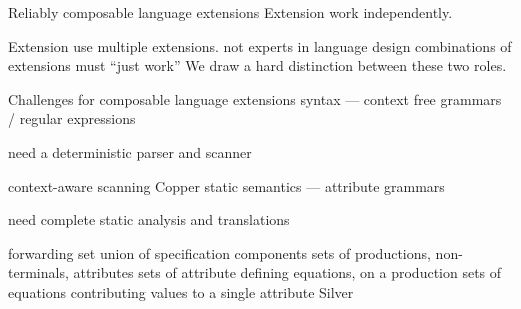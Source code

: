 \documentclass[11pt,aspectratio=169]{beamer}
\begin{document}
\begin{frame}{Reliably composable language extensions}
\biA
\x Extension  work independently.

\x Extension  use multiple extensions.
 \bi
  \x not experts in language design
  \x combinations of extensions must ``just work''
 \ei
\x We draw a hard distinction between these two roles.
\ei
{}
\end{frame}

\begin{frame}[t]{Challenges for composable language extensions}
\be
 \x syntax ---     context free grammars / regular expressions

    need a deterministic parser and scanner

  \bi
    context-aware scanning %
    Copper
  \ei
 \x static semantics ---     attribute grammars
    
    need complete static analysis and translations

  \bi
    forwarding %
    set union of specification components
    \bi
     \x sets of productions, non-terminals, attributes
     \x sets of attribute defining equations, on a production
     \x sets of equations contributing values to a single attribute
    \ei
    Silver
  \ei
\ee

\end{frame}
\end{document}
